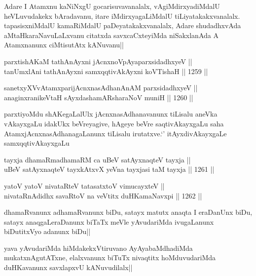 \begin{artha}
Adare I Atamxnu kaNiNxgU gocarisuvavanalalx, vAgiMdirxyadiMdalU heVLuvudakekx bAradavanu, itare iMdirxyagaLiMdalU tiLiyatakakxvanalalx. tapasisxniMdalU kamaRiMdalU paDeyatakakxvanalalx, Adare shudadhxvAda aMtaHkaraNavuLaLxvanu citatxda savxcaCxteyiMda niSakxlanAda A Atamxnanunx ciMtisutAtx kANuvanu||
\end{artha}

\begin{shl}
parxtishAKaM tathA\s nAyxni jAcnxnoVpAyaparxsidadhxyeV || \\
tanUmxlAni tathA\s nAyxni samxqqtivAkAyxni koVTishaH ||  1259 ||  
\end{shl}
				
\begin{shl}
sanetxyXVvA\s \s tamxparijAcnxnasAdhanAnAM parxsidadhxyeV || \\
anaginxranikeVtaH sAyxdashamAR\s sharaNoV muniH ||  1260 ||  
\end{shl}

\begin{artha}
parxtiyoMdu shAKegaLalUlx jAcnxnasAdhanavanunx tiLisalu aneVka vAkayxgaLu idakUkx beVreyagive, hAgeye beVre saqtivAkayxgaLu saha AtamxjAcnxnasAdhanagaLanunx tiLisalu irutatxve.`\stext'  itAyxdivAkayxgaLe samxqqtivAkayxgaLu
\end{artha}


\begin{shl}
tayxja dhamaRmadhamaRM ca uBeV satAyxnaqteV tayxja || \\
uBeV satAyxnaqteV tayxkAtxvX yeVna tayxjasi taM tayxja ||  1261 ||  
\end{shl}
				
\begin{shl}
yatoV yatoV nivataRteV tatasatxtoV vimucayxteV || \\
nivataRnAdidhx savaRtoV na veVtitx duHKamaNavxpi ||  1262 ||  
\end{shl}

\begin{artha}
dhamaRvanunx adhamaRvanunx biDu, satayx matutx anaqta I eraDanUnx biDu, satayx anaqgaLeraDanunx biTaTx meVle yAvudariMda ivugaLanunx biDutitxVyo adanunx biDu||
\end{artha}

\begin{artha}
yava yAvudariMda hiMdakekxVtiruvano AyAyabaMdhadiMda mukatxnAgutATxne, elalxvanunx biTuTx nivaqtitx hoMduvudariMda duHKavanunx savxlapxvU kANuvudilalx||
\end{artha}


